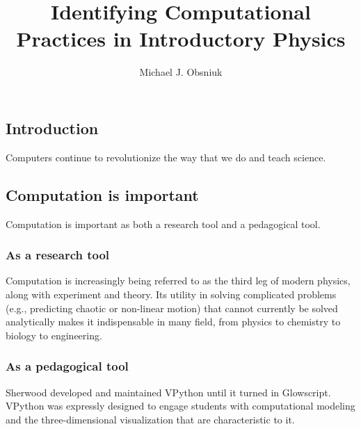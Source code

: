 \documentclass{msuphddissertation}
\author{Michael J. Obsniuk}
\title{Identifying Computational Practices in Introductory Physics}
\begin{document}


\TOC

\newpage
{}
\begin{doublespace}

%
%

\chapter{Introduction}

Computers continue to revolutionize the way that we do and teach science.

\section{Computation is important}

Computation is important as both a research tool and a pedagogical tool.

\subsection{As a research tool}

Computation is increasingly being referred to as the third leg of modern physics, along with experiment and theory.  Its utility in solving complicated problems (e.g., predicting chaotic or non-linear motion) that cannot currently be solved analytically makes it indispensable in many field, from physics to chemistry to biology to engineering.

\subsection{As a pedagogical tool}

Sherwood developed and maintained VPython until it turned in Glowscript.  VPython was expressly designed to engage students with computational modeling and the three-dimensional visualization that are characteristic to it.


\end{doublespace}
\end{document}
